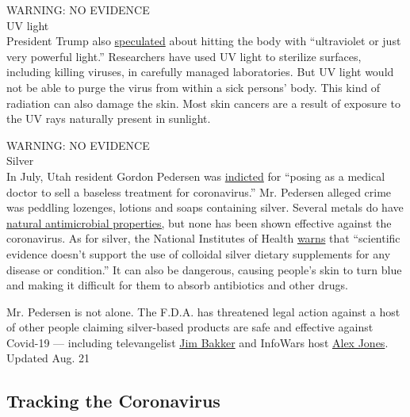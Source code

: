 WARNING: NO EVIDENCE\\
UV light\\
President Trump also
\href{https://www.nytimes3xbfgragh.onion/2020/04/24/health/sunlight-coronavirus-trump.html}{speculated}
about hitting the body with ``ultraviolet or just very powerful light.''
Researchers have used UV light to sterilize surfaces, including killing
viruses, in carefully managed laboratories. But UV light would not be
able to purge the virus from within a sick persons' body. This kind of
radiation can also damage the skin. Most skin cancers are a result of
exposure to the UV rays naturally present in sunlight.

WARNING: NO EVIDENCE\\
Silver\\
In July, Utah resident Gordon Pedersen was
\href{https://www.fda.gov/inspections-compliance-enforcement-and-criminal-investigations/press-releases/utah-man-posing-medical-doctor-sell-baseless-coronavirus-cure-indicted-fraud-charges}{indicted}
for ``posing as a medical doctor to sell a baseless treatment for
coronavirus.'' Mr. Pedersen alleged crime was peddling lozenges, lotions
and soaps containing silver. Several metals do have
\href{https://www.nytimes3xbfgragh.onion/article/copper-coronavirus-masks.html}{natural
antimicrobial properties,} but none has been shown effective against the
coronavirus. As for silver, the National Institutes of Health
\href{https://www.nccih.nih.gov/health/colloidal-silver}{warns} that
``scientific evidence doesn't support the use of colloidal silver
dietary supplements for any disease or condition.'' It can also be
dangerous, causing people's skin to turn blue and making it difficult
for them to absorb antibiotics and other drugs.

Mr. Pedersen is not alone. The F.D.A. has threatened legal action
against a host of other people claiming silver-based products are safe
and effective against Covid-19 --- including televangelist
\href{https://www.fda.gov/inspections-compliance-enforcement-and-criminal-investigations/warning-letters/jim-bakker-show-604820-03062020}{Jim
Bakker} and InfoWars host
\href{https://www.fda.gov/inspections-compliance-enforcement-and-criminal-investigations/warning-letters/free-speech-systems-llc-dba-infowarscom-605802-04092020}{Alex
Jones}.\\
Updated Aug. 21

\hypertarget{tracking-the-coronavirus}{%
\subsection{Tracking the Coronavirus}\label{tracking-the-coronavirus}}

